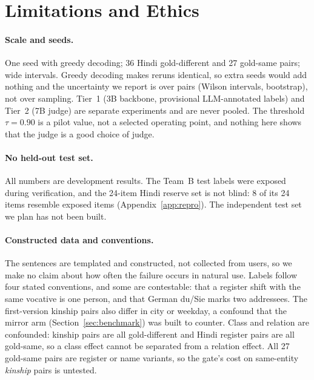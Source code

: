 \section{Limitations and Ethics}
\label{sec:limits}

\paragraph{Scale and seeds.} One seed with greedy decoding; 36 Hindi gold-different and 27 gold-same pairs; wide intervals. Greedy decoding
makes reruns identical, so extra seeds would add nothing and the uncertainty we report is over pairs (Wilson intervals, bootstrap), not over
sampling. Tier~1 (3B backbone, provisional LLM-annotated labels) and Tier~2 (7B judge) are separate experiments and are never pooled. The
threshold $\tau=0.90$ is a pilot value, not a selected operating point, and nothing here shows that the judge is a good choice of judge.

\paragraph{No held-out test set.} All numbers are development results. The Team~B test labels were exposed during verification, and the
24-item Hindi reserve set is not blind: 8 of its 24 items resemble exposed items (Appendix~\ref{app:repro}). The independent test set we plan
has not been built.

\paragraph{Constructed data and conventions.} The sentences are templated and constructed, not collected from users, so we make no claim
about how often the failure occurs in natural use. Labels follow four stated conventions, and some are contestable: that a register shift
with the same vocative is one person, and that German du/Sie marks two addressees. The first-version kinship pairs also differ in city or
weekday, a confound that the mirror arm (Section~\ref{sec:benchmark}) was built to counter. Class and relation are confounded: kinship pairs are all gold-different and
Hindi register pairs are all gold-same, so a class effect cannot be separated from a relation effect. All 27 gold-same pairs are register or
name variants, so the gate's cost on same-entity \emph{kinship} pairs is untested.

